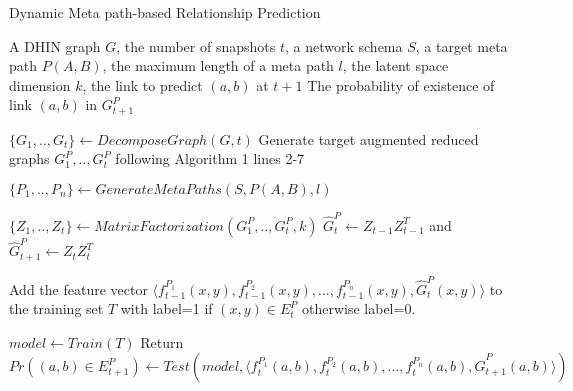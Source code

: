 \begin{algorithm}[t]
\caption{Dynamic Meta path-based Relationship Prediction}\label{alg2}
\begin{algorithmic}[1]\scriptsize
\REQUIRE A DHIN graph $G$, the number of snapshots $t$, a network schema $S$, a target meta path $P(A,B)$, the maximum length of a meta path $l$, the latent space dimension $k$, the link to predict $(a,b)$ at $t+1$
\ENSURE The probability of existence of link $(a,b)$ in $G^P_{t+1}$

\STATE $\{G_1, .., G_t\} \leftarrow DecomposeGraph(G, t)$
\STATE  Generate target augmented reduced graphs $G^P_1, .., G^P_t$ following Algorithm 1 lines 2-7

\STATE $\{P_1, .., P_n\} \leftarrow GenerateMetaPaths(S, P(A,B), l)$

%
%



\STATE $\{Z_1, .., Z_t\} \leftarrow MatrixFactorization(G^{P}_1, .., G^{P}_t, k)$
\STATE $\hat{G}^{P}_{t} \leftarrow Z_{t-1}Z^T_{t-1}$ and  $\hat{G}^{P}_{t+1} \leftarrow Z_tZ^T_t$



\STATE Add the feature vector $\langle f^{P_1}_{t-1}(x,y), f^{P_2}_{t-1}(x,y), ..., f^{P_n}_{t-1}(x,y), \hat{G}^{P}_{t}(x,y)\rangle$ to the training set $T$ with label=1 if $(x,y) \in E^{P}_{t}$ otherwise label=0.

\ENDFOR



\STATE $model \leftarrow Train(T)$
\STATE Return $Pr((a,b)\in E^P_{t+1}) \leftarrow Test(model, \langle f^{P_1}_{t}(a,b), f^{P_2}_{t}(a,b), ..., f^{P_n}_{t}(a,b), \hat{G}^{P}_{t+1}(a,b)\rangle)$

\end{algorithmic}
\end{algorithm}

